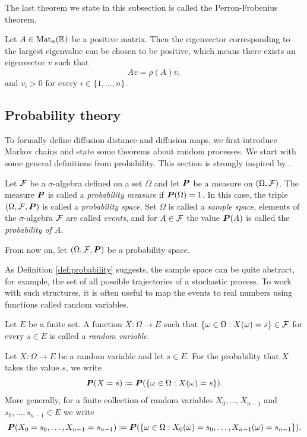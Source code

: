 The last theorem we state in this subsection is called the Perron-Frobenius theorem.

\begin{theorem}\label{thr:perron_frobenius}
    Let $A\in\text{Mat}_n(\mathbb{R})$ be a positive matrix. Then the eigenvector corresponding to the largest eigenvalue can be chosen to be positive, which means there exists an eigenvector $v$ such that
    $$
    Av = \rho(A)v,
    $$
    and $v_i>0$ for every $i\in\{1,\dots,n\}$.
\end{theorem}


\subsection{Probability theory}
To formally define diffusion distance and diffusion maps, we first introduce Markov chains and state some theorems about random processes. We start with some general definitions from probability. This section is strongly inspired by \cite{axler_measure}.

\begin{df}\label{def:probability}
    Let $\mathcal{F}$ be a $\sigma$-algebra defined on a set $\Omega$ and let $\boldsymbol{P}$ be a measure on $(\Omega, \mathcal{F})$. The measure $\boldsymbol{P}$ is called a \textit{probability measure} if $\boldsymbol{P}(\Omega)=1$. In this case, the triple $(\Omega, \mathcal{F}, \boldsymbol{P})$ is called a \textit{probability space}.
    Set $\Omega$ is called a \textit{sample space}, elements of the $\sigma$-algebra $\mathcal{F}$ are called \textit{events}, and for $A\in\mathcal{F}$ the value $\boldsymbol{P}(A)$ is called the \textit{probability of $A$}.
\end{df}

From now on, let $(\Omega, \mathcal{F}, \boldsymbol{P})$ be a probability space.

As Definition \ref{def:probability} suggests, the sample space can be quite abstract, for example, the set of all possible trajectories of a stochastic process. To work with such structures, it is often useful to map the events to real numbers using functions called random variables.

\begin{df}
    Let $E$ be a finite set. A function $X: \Omega \to E$ such that $\{\omega\in\Omega: X(\omega)=s\}\in\mathcal{F}$ for every $s\in E$ is called a \textit{random variable}.
\end{df}

Let  $X:\Omega\to E$ be a random variable and let $s\in E$. For the probability that $X$ takes the value $s$, we write $$\boldsymbol{P}(X=s)\coloneqq \boldsymbol{P}(\{\omega\in\Omega: X(\omega)=s\}).$$
More generally, for a finite collection of random variables $X_0,\dots,X_{n-1}$ and $s_{0},\dots,s_{n-1}\in E$ we write 
$$\boldsymbol{P}(X_0 = s_0,\dots, X_{n-1}=s_{n-1})\coloneqq\boldsymbol{P}(\{\omega\in\Omega:X_0(\omega)=s_0,\dots,X_{n-1}(\omega)=s_{n-1}\}).$$

